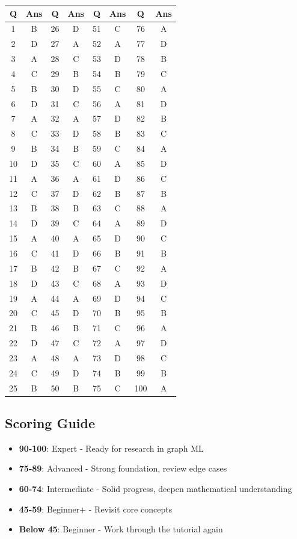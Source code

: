 \documentclass[12pt,a4paper]{article}
\begin{document}
\begin{center}
\begin{tabular}{|c|c||c|c||c|c||c|c|}
\hline
\textbf{Q} & \textbf{Ans} & \textbf{Q} & \textbf{Ans} & \textbf{Q} & \textbf{Ans} & \textbf{Q} & \textbf{Ans} \\
\hline
1 & B & 26 & D & 51 & C & 76 & A \\
2 & D & 27 & A & 52 & A & 77 & D \\
3 & A & 28 & C & 53 & D & 78 & B \\
4 & C & 29 & B & 54 & B & 79 & C \\
5 & B & 30 & D & 55 & C & 80 & A \\
6 & D & 31 & C & 56 & A & 81 & D \\
7 & A & 32 & A & 57 & D & 82 & B \\
8 & C & 33 & D & 58 & B & 83 & C \\
9 & B & 34 & B & 59 & C & 84 & A \\
10 & D & 35 & C & 60 & A & 85 & D \\
11 & A & 36 & A & 61 & D & 86 & C \\
12 & C & 37 & D & 62 & B & 87 & B \\
13 & B & 38 & B & 63 & C & 88 & A \\
14 & D & 39 & C & 64 & A & 89 & D \\
15 & A & 40 & A & 65 & D & 90 & C \\
16 & C & 41 & D & 66 & B & 91 & B \\
17 & B & 42 & B & 67 & C & 92 & A \\
18 & D & 43 & C & 68 & A & 93 & D \\
19 & A & 44 & A & 69 & D & 94 & C \\
20 & C & 45 & D & 70 & B & 95 & B \\
21 & B & 46 & B & 71 & C & 96 & A \\
22 & D & 47 & C & 72 & A & 97 & D \\
23 & A & 48 & A & 73 & D & 98 & C \\
24 & C & 49 & D & 74 & B & 99 & B \\
25 & B & 50 & B & 75 & C & 100 & A \\
\hline
\end{tabular}
\end{center}

\vspace{1cm}

\subsection*{Scoring Guide}
\begin{itemize}
    \item \textbf{90-100}: Expert - Ready for research in graph ML
    \item \textbf{75-89}: Advanced - Strong foundation, review edge cases
    \item \textbf{60-74}: Intermediate - Solid progress, deepen mathematical understanding
    \item \textbf{45-59}: Beginner+ - Revisit core concepts
    \item \textbf{Below 45}: Beginner - Work through the tutorial again
\end{itemize}
\end{document}
